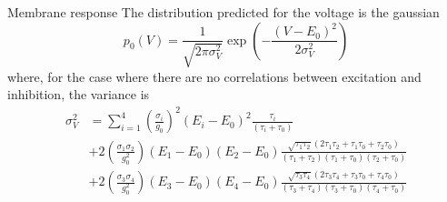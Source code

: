 \documentclass{beamer}
\begin{document}
\begin{frame}{Membrane response}
	The distribution predicted for the voltage is the gaussian
	\begin{equation}
		p_{0}(V)=\frac{1}{\sqrt{2 \pi \sigma_{V}^{2}}} \exp \left(-\frac{\left(V-E_{0}\right)^{2}}{2 \sigma_{V}^{2}}\right)
	\end{equation}
	where, for the case where there are no correlations between excitation and
	inhibition, the variance is 
	\begin{equation*}
	\begin{aligned}
		\sigma_{V}^{2}&=\sum_{i=1}^{4}\left(\frac{\sigma_{i}}{g_{0}}\right)^{2}\left(E_{i}-E_{0}\right)^{2} \frac{\tau_{i}}{\left(\tau_{i}+\tau_{0}\right)} \\
		&+ 2\left(\frac{\sigma_{1} \sigma_{2}}{g_{0}^{2}}\right)\left(E_{1}-E_{0}\right)\left(E_{2}-E_{0}\right) \frac{\sqrt{\tau_{1} \tau_{2}}\left(2 \tau_{1} \tau_{2}+\tau_{1} \tau_{0}+\tau_{2} \tau_{0}\right)}{\left(\tau_{1}+\tau_{2}\right)\left(\tau_{1}+\tau_{0}\right)\left(\tau_{2}+\tau_{0}\right)} \\
		&+ 2\left(\frac{\sigma_{3} \sigma_{4}}{g_{0}^{2}}\right)\left(E_{3}-E_{0}\right)\left(E_{4}-E_{0}\right) \frac{\sqrt{\tau_{3} \tau_{4}}\left(2 \tau_{3} \tau_{4}+\tau_{3} \tau_{0}+\tau_{4} \tau_{0}\right)}{\left(\tau_{3}+\tau_{4}\right)\left(\tau_{3}+\tau_{0}\right)\left(\tau_{4}+\tau_{0}\right)}
	\end{aligned}
	\end{equation*}
\end{frame}
\end{document}
